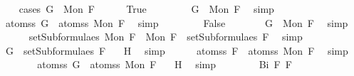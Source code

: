 \begin{isabellebody}
\ \ \isamarkupfalse%
\ {\isacharparenleft}cases\ {\isachardoublequoteopen}G\ {\isacharequal}\ Mon\ F{\isachardoublequoteclose}{\isacharparenright}\isanewline
\ \ \ \ \isamarkupfalse%
\ True\ \isanewline
\ \ \ \ \isamarkupfalse%
\ \isamarkupfalse%
\ {\isachardoublequoteopen}G\ {\isacharequal}\ Mon\ F{\isachardoublequoteclose}\ \isamarkupfalse%
\ simp\isanewline
\ \ \ \ \isamarkupfalse%
\ \isamarkupfalse%
\ {\isachardoublequoteopen}atoms{\isacharunderscore}s\ G\ {\isasymsubseteq}\ atoms{\isacharunderscore}s\ {\isacharparenleft}Mon\ F{\isacharparenright}{\isachardoublequoteclose}\ \isamarkupfalse%
\ simp\isanewline
\ \ \isamarkupfalse%
\isanewline
\ \ \ \ \isamarkupfalse%
\ False\isanewline
\ \ \ \ \isamarkupfalse%
\ \isamarkupfalse%
\ {}{\isacharcolon}{\isachardoublequoteopen}G\ {\isasymnoteq}\ Mon\ F{\isachardoublequoteclose}\ \isamarkupfalse%
\ simp\isanewline
\ \ \ \ \isamarkupfalse%
\ {\isachardoublequoteopen}setSubformulae{\isacharunderscore}s\ {\isacharparenleft}Mon\ F{\isacharparenright}\ {\isacharequal}\ {\isacharbraceleft}Mon\ F{\isacharbraceright}\ {\isasymunion}\ setSubformulae{\isacharunderscore}s\ F{\isachardoublequoteclose}\ \isamarkupfalse%
\ simp\isanewline
\ \ \ \ \isamarkupfalse%
\ \isamarkupfalse%
\ {}{\isacharcolon}{\isachardoublequoteopen}G\ {\isasymin}\ setSubformulae{\isacharunderscore}s\ F{\isachardoublequoteclose}\ \isamarkupfalse%
\ {}\ H{}\ \isamarkupfalse%
\ simp\isanewline
\ \ \ \ \isamarkupfalse%
\ {\isachardoublequoteopen}atoms{\isacharunderscore}s\ F\ {\isacharequal}\ atoms{\isacharunderscore}s\ {\isacharparenleft}Mon\ F{\isacharparenright}{\isachardoublequoteclose}\ \isamarkupfalse%
\ simp\isanewline
\ \ \ \ \isamarkupfalse%
\ \isamarkupfalse%
\ {\isachardoublequoteopen}atoms{\isacharunderscore}s\ G\ {\isasymsubseteq}\ atoms{\isacharunderscore}s\ {\isacharparenleft}Mon\ F{\isacharparenright}{\isachardoublequoteclose}\ \isamarkupfalse%
\ {}\ H{}\ \isamarkupfalse%
\ simp\isanewline
\ \ \isamarkupfalse%
\ \isanewline
{}\isamarkupfalse%
\isanewline
\ \ \isamarkupfalse%
\ {\isacharparenleft}Bi\ F{}\ F{}{\isacharparenright}\isanewline

\end{isabellebody}
